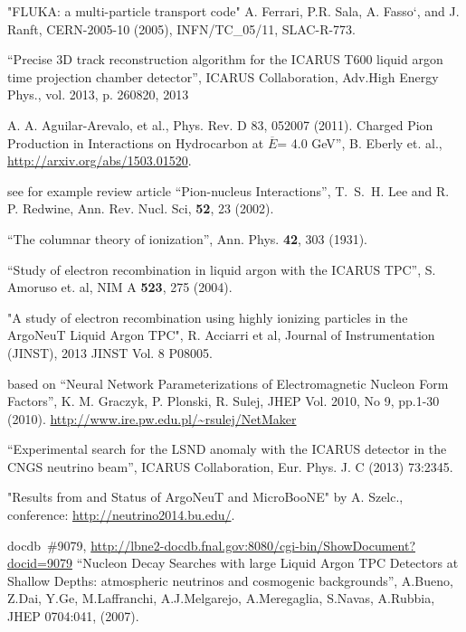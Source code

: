 \begin{thebibliography}{99}
 "FLUKA: a multi-particle transport code" A. Ferrari, P.R. Sala, A. Fasso`, and J. Ranft, CERN-2005-10 (2005), INFN/TC\_05/11, SLAC-R-773.

``Precise 3D track reconstruction algorithm for the ICARUS T600 liquid argon time projection chamber detector'', ICARUS Collaboration, 
Adv.High Energy Phys., vol. 2013, p. 260820, 2013

  A. A. Aguilar-Arevalo, et al.,
Phys. Rev. D 83, 052007 (2011).
 Charged Pion Production in Interactions on Hydrocarbon 
at $\overline{E}$= 4.0 GeV'', B. Eberly et. al., \url{http://arxiv.org/abs/1503.01520}.

 see for example review article ``Pion-nucleus Interactions'',
T.~S.~H. Lee and R. P. Redwine, Ann. Rev. Nucl. Sci,  {\bf 52}, 23 (2002).

 ``The columnar theory of ionization'', Ann. Phys. {\bf 42}, 303 (1931).

 ``Study of electron recombination in liquid argon with the ICARUS TPC'', S. Amoruso et. al, NIM A {\bf 523}, 275 (2004). 

 "A study of electron recombination using highly ionizing particles in the ArgoNeuT Liquid Argon TPC", 
R. Acciarri et al, Journal of Instrumentation 
(JINST), 2013 JINST Vol. 8 P08005.



 based on
``Neural Network Parameterizations of Electromagnetic Nucleon Form Factors'', K. M. Graczyk, P. Plonski, R. Sulej, JHEP Vol. 2010, No 9, pp.1-30 (2010).
\url{http://www.ire.pw.edu.pl/~rsulej/NetMaker}


 ``Experimental search for the LSND anomaly with the ICARUS
detector in the CNGS neutrino beam'', ICARUS Collaboration, Eur. Phys. J. C (2013) 73:2345.

 "Results from and Status of ArgoNeuT and MicroBooNE" by 
A. Szelc., conference: \url{http://neutrino2014.bu.edu/}.

 docdb~\#9079, \url{http://lbne2-docdb.fnal.gov:8080/cgi-bin/ShowDocument?docid=9079}
``Nucleon Decay Searches with large Liquid Argon TPC Detectors at Shallow Depths: atmospheric neutrinos and cosmogenic backgrounds'', A.Bueno, Z.Dai, Y.Ge, M.Laffranchi, A.J.Melgarejo, A.Meregaglia, S.Navas, A.Rubbia, JHEP 0704:041, (2007).


\end{thebibliography}
